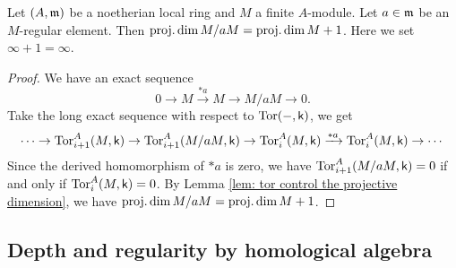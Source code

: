     \begin{proposition}\label{prop: induction on projective dimension}
        Let \((A,{\mathfrak{m}})\) be a noetherian local ring and \(M\) a finite \(A\)-module.
        Let \(a \in {\mathfrak{m}}\) be an \(M\)-regular element.
        Then \(\operatorname{proj.dim} M/aM = \operatorname{proj.dim} M + 1\).
        Here we set \(\infty + 1 = \infty\).
    \end{proposition}
    \begin{proof}
        We have an exact sequence
        \[ 0 \to M  \xrightarrow{*a} M \to M/aM \to 0. \]
        Take the long exact sequence with respect to \(\operatorname{Tor}(-,{\mathsf{k}})\), we get
        \[ \cdots \to \operatorname{Tor}_{i+1}^A(M,{\mathsf{k}}) \to \operatorname{Tor}_{i+1}^A(M/aM,{\mathsf{k}}) \to \operatorname{Tor}_i^A(M,{\mathsf{k}}) \xrightarrow{*a} \operatorname{Tor}_i^A(M,{\mathsf{k}}) \to \cdots \]
        Since the derived homomorphism of \(*a\) is zero, we have \(\operatorname{Tor}_{i+1}^A(M/aM,{\mathsf{k}}) = 0\) if and only if \(\operatorname{Tor}_{i}^A(M,{\mathsf{k}}) = 0\).
        By Lemma \ref{lem: tor control the projective dimension}, we have \(\operatorname{proj.dim} M/aM = \operatorname{proj.dim} M + 1\).
    \end{proof}

\subsection{Depth and regularity by homological algebra}

